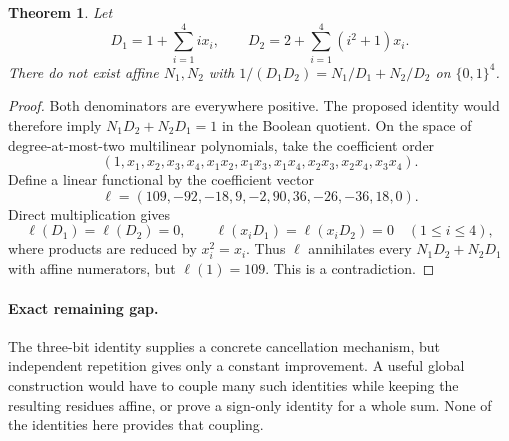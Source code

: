 \documentclass[11pt]{article}
\newtheorem{theorem}{Theorem}
\begin{document}
\begin{theorem}
Let
\[
 D_1=1+\sum_{i=1}^4 i x_i,\qquad
 D_2=2+\sum_{i=1}^4(i^2+1)x_i.
\]
There do not exist affine $N_1,N_2$ with
$1/(D_1D_2)=N_1/D_1+N_2/D_2$ on $\{0,1\}^4$.
\end{theorem}
\begin{proof}
Both denominators are everywhere positive. The proposed identity
would therefore imply $N_1D_2+N_2D_1=1$ in the Boolean quotient.
On the space of degree-at-most-two multilinear polynomials, take
the coefficient order
\[
 (1,x_1,x_2,x_3,x_4,x_1x_2,x_1x_3,x_1x_4,
                          x_2x_3,x_2x_4,x_3x_4).
\]
Define a linear functional by the coefficient vector
\[
 \ell=(109,-92,-18,9,-2,90,36,-26,-36,18,0).
\]
Direct multiplication gives
\[
 \ell(D_1)=\ell(D_2)=0,\qquad
 \ell(x_iD_1)=\ell(x_iD_2)=0\quad(1\le i\le4),
\]
where products are reduced by $x_i^2=x_i$. Thus $\ell$ annihilates
every $N_1D_2+N_2D_1$ with affine numerators, but $\ell(1)=109$.
This is a contradiction.
\end{proof}

\paragraph{Exact remaining gap.}
The three-bit identity supplies a concrete cancellation mechanism,
but independent repetition gives only a constant improvement. A
useful global construction would have to couple many such
identities while keeping the resulting residues affine, or prove
a sign-only identity for a whole sum. None of the identities here
provides that coupling.
\end{document}
